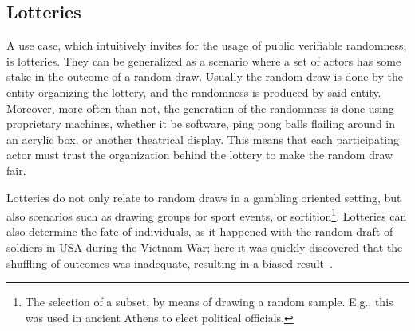 \subsection{Lotteries}\label{subsec:usecase_lotteries}
A use case, which intuitively invites for the usage of public verifiable randomness, is lotteries.
They can be generalized as a scenario where a set of actors has some stake in the outcome of a random draw.
Usually the random draw is done by the entity organizing the lottery, and the randomness is produced by said entity.
Moreover, more often than not, the generation of the randomness is done using proprietary machines, whether it be software, ping pong balls flailing around in an acrylic box, or another theatrical display.
This means that each participating actor must trust the organization behind the lottery to make the random draw fair.

Lotteries do not only relate to random draws in a gambling oriented setting, but also scenarios such as drawing groups for sport events, or sortition\footnote{The selection of a subset, by means of drawing a random sample. E.g., this was used in ancient Athens to elect political officials.}.
Lotteries can also determine the fate of individuals, as it happened with the random draft of soldiers in USA during the Vietnam War; here it was quickly discovered that the shuffling of outcomes was inadequate, resulting in a biased result~\cite{starr1997nonrandom}.
